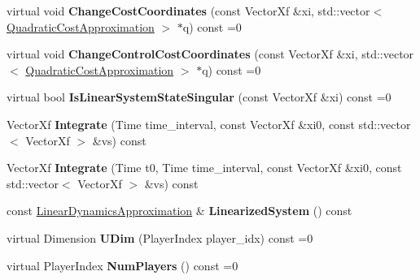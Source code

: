 \begin{DoxyCompactItemize}
\item 
virtual void {\bfseries Change\+Cost\+Coordinates} (const Vector\+Xf \&xi, std\+::vector$<$ \hyperlink{structilqgames_1_1_quadratic_cost_approximation}{Quadratic\+Cost\+Approximation} $>$ $\ast$q) const =0\hypertarget{classilqgames_1_1_multi_player_flat_system_a25f774ea87c09b634ee2ab9254c847a2}{}\label{classilqgames_1_1_multi_player_flat_system_a25f774ea87c09b634ee2ab9254c847a2}

\item 
virtual void {\bfseries Change\+Control\+Cost\+Coordinates} (const Vector\+Xf \&xi, std\+::vector$<$ \hyperlink{structilqgames_1_1_quadratic_cost_approximation}{Quadratic\+Cost\+Approximation} $>$ $\ast$q) const =0\hypertarget{classilqgames_1_1_multi_player_flat_system_ac267c5a7404b415270ef296e202e9a69}{}\label{classilqgames_1_1_multi_player_flat_system_ac267c5a7404b415270ef296e202e9a69}

\item 
virtual bool {\bfseries Is\+Linear\+System\+State\+Singular} (const Vector\+Xf \&xi) const =0\hypertarget{classilqgames_1_1_multi_player_flat_system_ad6087e0a046965cafa165e0b91c522c6}{}\label{classilqgames_1_1_multi_player_flat_system_ad6087e0a046965cafa165e0b91c522c6}

\item 
Vector\+Xf {\bfseries Integrate} (Time time\+\_\+interval, const Vector\+Xf \&xi0, const std\+::vector$<$ Vector\+Xf $>$ \&vs) const \hypertarget{classilqgames_1_1_multi_player_flat_system_afb949d4a488fd42bc2e250d520ef3b1e}{}\label{classilqgames_1_1_multi_player_flat_system_afb949d4a488fd42bc2e250d520ef3b1e}

\item 
Vector\+Xf {\bfseries Integrate} (Time t0, Time time\+\_\+interval, const Vector\+Xf \&xi0, const std\+::vector$<$ Vector\+Xf $>$ \&vs) const \hypertarget{classilqgames_1_1_multi_player_flat_system_acfdf524322acc6a648bf8ace934a2786}{}\label{classilqgames_1_1_multi_player_flat_system_acfdf524322acc6a648bf8ace934a2786}

\item 
const \hyperlink{structilqgames_1_1_linear_dynamics_approximation}{Linear\+Dynamics\+Approximation} \& {\bfseries Linearized\+System} () const \hypertarget{classilqgames_1_1_multi_player_flat_system_a7bfa1936fce9997d061c86ce37d874b6}{}\label{classilqgames_1_1_multi_player_flat_system_a7bfa1936fce9997d061c86ce37d874b6}

\item 
virtual Dimension {\bfseries U\+Dim} (Player\+Index player\+\_\+idx) const =0\hypertarget{classilqgames_1_1_multi_player_flat_system_a1cb3a0636263a35dd2b10f8b203bf29b}{}\label{classilqgames_1_1_multi_player_flat_system_a1cb3a0636263a35dd2b10f8b203bf29b}

\item 
virtual Player\+Index {\bfseries Num\+Players} () const =0\hypertarget{classilqgames_1_1_multi_player_flat_system_a5732cac3a3a64567a3d1b460d787a52d}{}\label{classilqgames_1_1_multi_player_flat_system_a5732cac3a3a64567a3d1b460d787a52d}

\end{DoxyCompactItemize}
